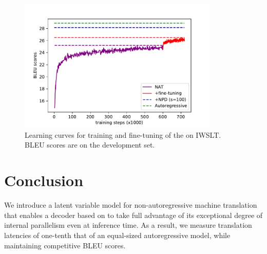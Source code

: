 \begin{figure}[htbp]
\centering
\includegraphics[width=0.85\textwidth]{figs/nat/learning_curve}
\caption{Learning curves for training and fine-tuning of the \model{} on IWSLT. BLEU scores are on the development set.}
\end{figure}

\section{Conclusion}
We introduce a latent variable model for non-autoregressive machine translation that enables a decoder based on \citet{vaswani2017attention} to take full advantage of its exceptional degree of internal parallelism even at inference time. As a result, we measure translation latencies of one-tenth that of an equal-sized autoregressive model, while maintaining competitive BLEU scores.


